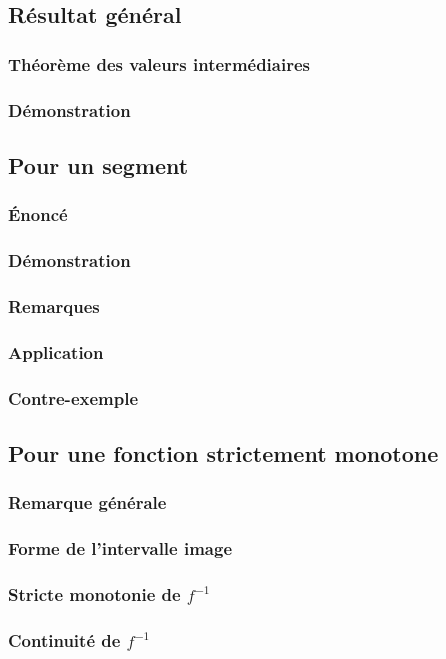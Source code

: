 \documentclass[12pt,a4paper,french]{book}
\begin{document}
		\subsection{Résultat général}
			\subsubsection{Théorème des valeurs intermédiaires}
			\subsubsection{Démonstration}
		\subsection{Pour un segment}
			\subsubsection{Énoncé}
			\subsubsection{Démonstration}
			\subsubsection{Remarques}
			\subsubsection{Application}
			\subsubsection{Contre-exemple}
		\subsection{Pour une fonction strictement monotone}
			\subsubsection{Remarque générale}
			\subsubsection{Forme de l'intervalle image}
			\subsubsection{Stricte monotonie de $f^{-1}$}
			\subsubsection{Continuité de $f^{-1}$}
\end{document}
